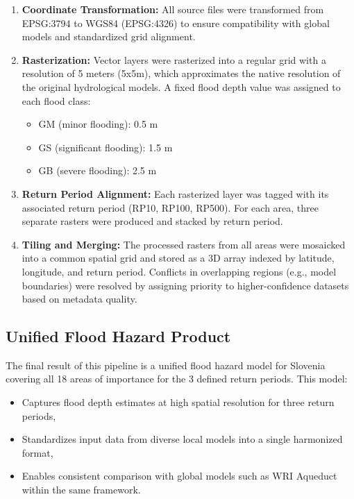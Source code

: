 \begin{enumerate}
    \item \textbf{Coordinate Transformation:} All source files were transformed from EPSG:3794 to WGS84 (EPSG:4326) to ensure compatibility with global models and standardized grid alignment.
    
    \item \textbf{Rasterization:} Vector layers were rasterized into a regular grid with a resolution of 5 meters (5x5m), which approximates the native resolution of the original hydrological models. A fixed flood depth value was assigned to each flood class:
    \begin{itemize}
        \item GM (minor flooding): 0.5 m
        \item GS (significant flooding): 1.5 m
        \item GB (severe flooding): 2.5 m
    \end{itemize}
    
    \item \textbf{Return Period Alignment:} Each rasterized layer was tagged with its associated return period (RP10, RP100, RP500). For each area, three separate rasters were produced and stacked by return period.
    
    \item \textbf{Tiling and Merging:} The processed rasters from all areas were mosaicked into a common spatial grid and stored as a 3D array indexed by latitude, longitude, and return period. Conflicts in overlapping regions (e.g., model boundaries) were resolved by assigning priority to higher-confidence datasets based on metadata quality.
\end{enumerate}

\subsection{Unified Flood Hazard Product}

The final result of this pipeline is a unified flood hazard model for Slovenia covering all 18 areas of importance for the 3 defined return periods. This model:
\begin{itemize}
    \item Captures flood depth estimates at high spatial resolution for three return periods,
    \item Standardizes input data from diverse local models into a single harmonized format,
    \item Enables consistent comparison with global models such as WRI Aqueduct within the same framework.
\end{itemize}

